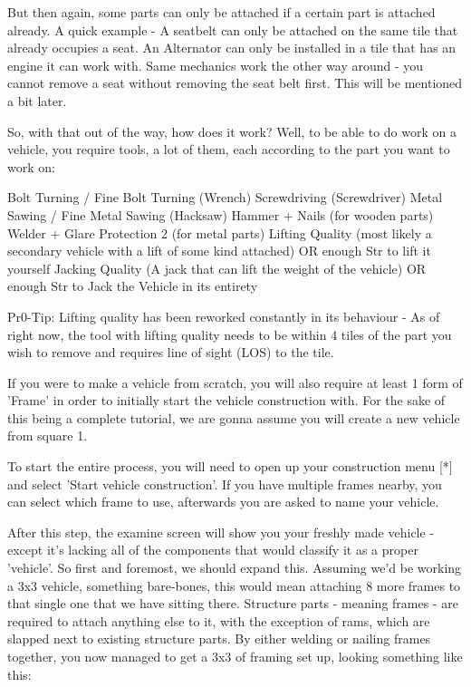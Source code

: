 \documentclass[11pt]{report}
\begin{document}
But then again, some parts can only be attached if a certain part is attached already. A quick example - A seatbelt can only be attached on the same tile that already occupies a seat. An Alternator can only be installed in a tile that has an engine it can work with. Same mechanics work the other way around - you cannot remove a seat without removing the seat belt first. This will be mentioned a bit later.

So, with that out of the way, how does it work? Well, to be able to do work on a vehicle, you require tools, a lot of them, each according to the part you want to work on:

Bolt Turning / Fine Bolt Turning (Wrench)
Screwdriving (Screwdriver)
Metal Sawing / Fine Metal Sawing (Hacksaw)
Hammer + Nails (for wooden parts)
Welder + Glare Protection 2 (for metal parts)
Lifting Quality (most likely a secondary vehicle with a lift of some kind attached) OR enough Str to lift it yourself
Jacking Quality (A jack that can lift the weight of the vehicle) OR enough Str to Jack the Vehicle in its entirety

Pr0-Tip: Lifting quality has been reworked constantly in its behaviour - As of right now, the tool with lifting quality needs to be within 4 tiles of the part you wish to remove and requires line of sight (LOS) to the tile.

If you were to make a vehicle from scratch, you will also require at least 1 form of 'Frame' in order to initially start the vehicle construction with. For the sake of this being a complete tutorial, we are gonna assume you will create a new vehicle from square 1.

To start the entire process, you will need to open up your construction menu [*] and select 'Start vehicle construction'. If you have multiple frames nearby, you can select which frame to use, afterwards you are asked to name your vehicle.

After this step, the examine screen will show you your freshly made vehicle - except it's lacking all of the components that would classify it as a proper 'vehicle'. So first and foremost, we should expand this. Assuming we'd be working a 3x3 vehicle, something bare-bones, this would mean attaching 8 more frames to that single one that we have sitting there. Structure parts - meaning frames - are required to attach anything else to it, with the exception of rams, which are slapped next to existing structure parts. By either welding or nailing frames together, you now managed to get a 3x3 of framing set up, looking something like this:
\end{document}
